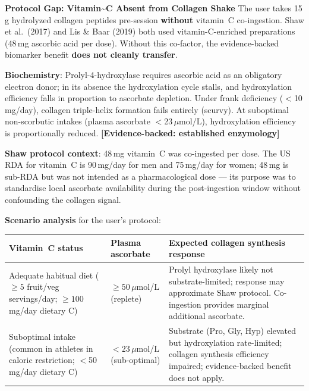 \begin{warningbox}{\textbf{Protocol Gap: Vitamin\textasciitilde{}C Absent from Collagen Shake}}
The user takes 15\,g hydrolyzed collagen peptides pre-session \textbf{without} vitamin~C co-ingestion. Shaw et al.\ (2017) and Lis \& Baar (2019) both used vitamin-C-enriched preparations (48\,mg ascorbic acid per dose). Without this co-factor, the evidence-backed biomarker benefit \textbf{does not cleanly transfer}.
\end{warningbox}

\textbf{Biochemistry}: Prolyl-4-hydroxylase requires ascorbic acid as an obligatory electron donor; in its absence the hydroxylation cycle stalls, and hydroxylation efficiency falls in proportion to ascorbate depletion. Under frank deficiency ($<$10\,mg/day), collagen triple-helix formation fails entirely (scurvy). At suboptimal non-scorbutic intakes (plasma ascorbate $<$23\,$\mu$mol/L), hydroxylation efficiency is proportionally reduced. \textbf{[Evidence-backed: established enzymology]}

\textbf{Shaw protocol context}: 48\,mg vitamin~C was co-ingested per dose. The US RDA for vitamin~C is 90\,mg/day for men and 75\,mg/day for women; 48\,mg is sub-RDA but was not intended as a pharmacological dose --- its purpose was to standardise local ascorbate availability during the post-ingestion window without confounding the collagen signal.

\textbf{Scenario analysis} for the user's protocol:

\begin{center}
\begin{tabular}{>{\raggedright\arraybackslash}p{3.2cm}
                >{\raggedright\arraybackslash}p{3.8cm}
                >{\raggedright\arraybackslash}p{5.5cm}}
\toprule
\textbf{Vitamin~C status} & \textbf{Plasma ascorbate} & \textbf{Expected collagen synthesis response} \\
\midrule
Adequate habitual diet (${\geq}5$ fruit/veg servings/day; ${\geq}100$\,mg/day dietary C) & ${\geq}50$\,$\mu$mol/L (replete) & Prolyl hydroxylase likely not substrate-limited; response may approximate Shaw protocol. Co-ingestion provides marginal additional ascorbate. \\
\addlinespace
Suboptimal intake (common in athletes in caloric restriction; $<$50\,mg/day dietary C) & ${<}23$\,$\mu$mol/L (sub-optimal) & Substrate (Pro, Gly, Hyp) elevated but hydroxylation rate-limited; collagen synthesis efficiency impaired; evidence-backed benefit does not apply. \\
\bottomrule
\end{tabular}
\end{center}

